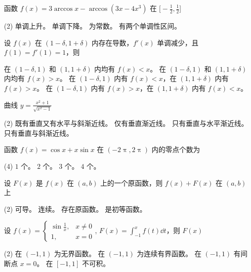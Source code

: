 \begin{ti}
	函数 $f(x) = 3 \arccos x - \arccos (3x-4x^3)$ 在 $\biggl[ -\frac{1}{2},\frac{1}{2} \biggr]$
	\begin{tasks}(2)
		\task 单调上升。
		\task 单调下降。
		\task 为常数。
		\task 有两个单调性区间。
	\end{tasks}
\end{ti}

\begin{ti}
	设 $f(x)$ 在 $(1-\delta,1+\delta)$ 内存在导数，$f'(x)$ 单调减少，且 $f(1) = f'(1) = 1$，则
	\begin{tasks}
		\task 在 $(1-\delta,1)$ 和 $(1,1+\delta)$ 内均有 $f(x) < x$。
		\task 在 $(1-\delta,1)$ 和 $(1,1+\delta)$ 内均有 $f(x) > x$。
		\task 在 $(1-\delta,1)$ 内有 $f(x) < x$，在 $(1,1+\delta)$ 内有 $f(x) > x$。
		\task 在 $(1-\delta,1)$ 内有 $f(x) > x$，在 $(1,1+\delta)$ 内有 $f(x) < x$。
	\end{tasks}
\end{ti}

\begin{ti}
	曲线 $y = \frac{x^2+1}{\sqrt{x^2-1}}$
	\begin{tasks}(2)
		\task 既有垂直又有水平与斜渐近线。\xeCJKnobreak
		\task 仅有垂直渐近线。
		\task 只有垂直与水平渐近线。
		\task 只有垂直与斜渐近线。
	\end{tasks}
\end{ti}

\begin{ti}
	函数 $f(x) = \cos x + x \sin x$ 在 $(-2\uppi,2\uppi)$ 内的零点个数为
	\begin{tasks}(4)
		\task $1$ 个。
		\task $2$ 个。
		\task $3$ 个。
		\task $4$ 个。
	\end{tasks}
\end{ti}

\begin{ti}
	设 $F(x)$ 是 $f(x)$ 在 $(a,b)$ 上的一个原函数，则 $f(x) + F(x)$ 在 $(a,b)$ 上
	\begin{tasks}(2)
		\task 可导。
		\task 连续。
		\task 存在原函数。
		\task 是初等函数。
	\end{tasks}
\end{ti}

\begin{ti}
	设 $f(x) = \begin{cases}
		\sin \frac{1}{x}, & x \ne 0 \\
		1, & x = 0
	\end{cases}$, $F(x) = \int_{-1}^x f(t) \dd{t}$，则 $F(x)$
	\begin{tasks}(2)
		\task 在 $(-1,1)$ 为无界函数。
		\task 在 $(-1,1)$ 为连续有界函数。
		\task 在 $(-1,1)$ 有间断点 $x=0$。
		\task 在 $[-1,1]$ 不可积。
	\end{tasks}
\end{ti}

